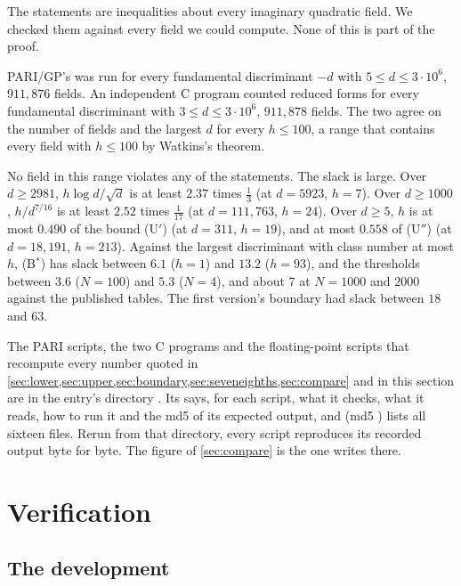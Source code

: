 \documentclass[11pt]{article}
\theoremstyle{definition}
\begin{document}
The statements are inequalities about every imaginary quadratic field. We checked them against every field we could compute. None of this is part of the proof.

PARI/GP's  was run for every fundamental discriminant $-d$ with $5 \le d \le 3\cdot10^6$, $911{,}876$ fields. An independent C program counted reduced forms for every fundamental discriminant with $3 \le d \le 3\cdot10^6$, $911{,}878$ fields. The two agree on the number of fields and the largest $d$ for every $h \le 100$, a range that contains every field with $h \le 100$ by Watkins's theorem.

No field in this range violates any of the statements. The slack is large. Over $d \ge 2981$, $h\log d/\sqrt d$ is at least $2.37$ times $\frac13$ (at $d = 5923$, $h = 7$). Over $d \ge 1000$, $h/d^{7/16}$ is at least $2.52$ times $\frac1{17}$ (at $d = 111{,}763$, $h = 24$). Over $d \ge 5$, $h$ is at most $0.490$ of the bound (U$'$) (at $d = 311$, $h = 19$), and at most $0.558$ of (U$''$) (at $d = 18{,}191$, $h = 213$). Against the largest discriminant with class number at most $h$, (B$^*$) has slack between $6.1$ ($h = 1$) and $13.2$ ($h = 93$), and the thresholds between $3.6$ ($N = 100$) and $5.3$ ($N = 4$), and about $7$ at $N = 1000$ and $2000$ against the published tables. The first version's boundary had slack between $18$ and $63$.

The PARI scripts, the two C programs and the floating-point scripts that recompute every number quoted in \cref{sec:lower,sec:upper,sec:boundary,sec:seveneighths,sec:compare} and in this section are in the entry's directory . Its  says, for each script, what it checks, what it reads, how to run it and the md5 of its expected output, and  (md5 ) lists all sixteen files. Rerun from that directory, every script reproduces its recorded output byte for byte. The figure of \cref{sec:compare} is the one  writes there.

\section{Verification}\label{sec:verification}

\subsection{The development}\label{sec:development}
\end{document}

